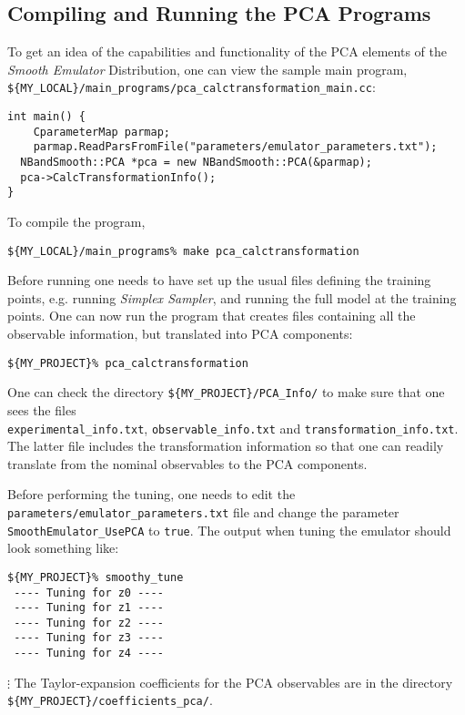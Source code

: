 \documentclass[UserManual.tex]{subfiles}
\begin{document}
\subsection{Compiling and Running the PCA Programs}
To get an idea of the capabilities and functionality of the PCA elements of the {\it Smooth Emulator} Distribution, one can view the sample main program,\\
{\tt \$\{MY\_LOCAL\}/main\_programs/pca\_calctransformation\_main.cc}:
{\tt\begin{verbatim}
int main() {
	CparameterMap parmap;
	parmap.ReadParsFromFile("parameters/emulator_parameters.txt");
  NBandSmooth::PCA *pca = new NBandSmooth::PCA(&parmap);
  pca->CalcTransformationInfo();
}
\end{verbatim}}
To compile the program,
{\tt\begin{verbatim}
${MY_LOCAL}/main_programs% make pca_calctransformation
\end{verbatim}}
Before running one needs to have set up the usual files defining the training points, e.g. running {\it Simplex Sampler}, and running the full model at the training points. One can now run the program that creates files containing all the observable information, but translated into PCA components:
{\tt\begin{verbatim}
${MY_PROJECT}% pca_calctransformation
\end{verbatim}}
One can check the directory {\tt \$\{MY\_PROJECT\}/PCA\_Info/} to make sure that one sees the files\\{\tt experimental\_info.txt}, {\tt observable\_info.txt} and {\tt transformation\_info.txt}. The latter file includes the transformation information so that one can readily translate from the nominal observables to the PCA components.

Before performing the tuning, one needs to edit the {\tt parameters/emulator\_parameters.txt} file and change the parameter {\tt SmoothEmulator\_UsePCA} to {\tt true}. The output when tuning the emulator should look something like:
{\tt\begin{verbatim}
${MY_PROJECT}% smoothy_tune
 ---- Tuning for z0 ----
 ---- Tuning for z1 ----
 ---- Tuning for z2 ----
 ---- Tuning for z3 ----
 ---- Tuning for z4 ----
\end{verbatim}} \vspace*{-16pt}
\hspace*{352pt}$\vdots$
The Taylor-expansion coefficients for the PCA observables are in the directory {\tt \$\{MY\_PROJECT\}/coefficients\_pca/}. 
\end{document}

